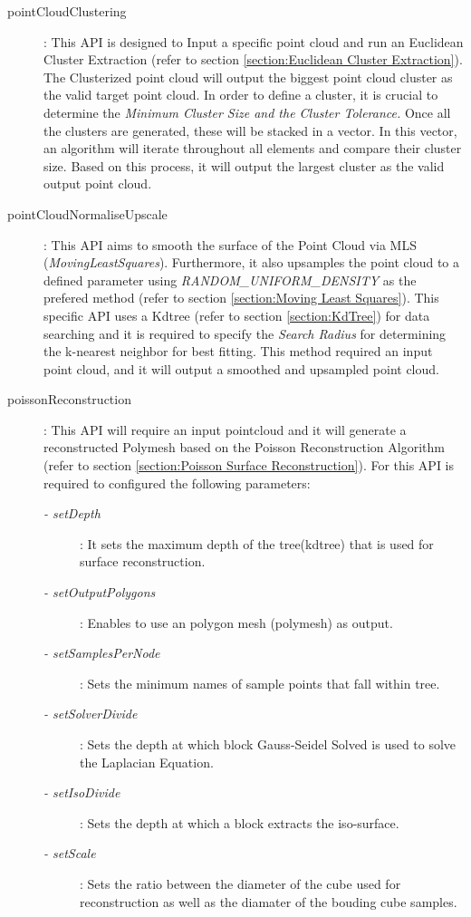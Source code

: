\documentclass[12pt]{report}
\begin{document}
\begin{description}
  \item[pointCloudClustering]: This API is designed to Input a specific point cloud and run an Euclidean Cluster Extraction (refer to section \ref{section:Euclidean Cluster Extraction}). The Clusterized point cloud will output the biggest point cloud cluster as the valid target point cloud.
   In order to define a cluster, it is crucial to determine the \textit{Minimum Cluster Size and the Cluster Tolerance.} Once all the clusters are generated, these will be stacked in a vector. 
   In this vector, an algorithm will iterate throughout all elements and compare their cluster size. Based on this process, it will output the largest cluster as the valid output point cloud.
   \item[pointCloudNormaliseUpscale]: This API aims to smooth the surface of the Point Cloud via MLS (\textit{MovingLeastSquares}). 
   Furthermore, it also upsamples the point cloud to a defined parameter using \textit{RANDOM\_UNIFORM\_DENSITY} as the prefered method (refer to section \ref{section:Moving Least Squares}). 
    This specific API uses a Kdtree (refer to section \ref{section:KdTree}) for data searching and it is required to specify the \textit{Search Radius} for determining the k-nearest neighbor for best fitting. 
   This method required an input point cloud, and it will output a smoothed and upsampled point cloud.
   \item[poissonReconstruction]: This API will require an input pointcloud and it will generate a reconstructed Polymesh based on the Poisson Reconstruction Algorithm (refer to section \ref{section:Poisson Surface Reconstruction}).
   For this API is required to configured the following parameters:
   \begin{description}
     \item[\textit{- setDepth}]: It sets the maximum depth of the tree(kdtree) that is used for surface reconstruction. 
     \item[\textit{- setOutputPolygons}] : Enables to use an polygon mesh (polymesh) as output.
     \item[\textit{- setSamplesPerNode}] : Sets the minimum names of sample points that fall within tree.
     \item[\textit{- setSolverDivide}] : Sets the depth at which block Gauss-Seidel Solved is used to solve the Laplacian Equation.
     \item[\textit{- setIsoDivide}] : Sets the depth at which a block extracts the iso-surface.
     \item[\textit{- setScale}] : Sets the ratio between the diameter of the cube used for reconstruction as well as the diamater of the bouding cube samples.
   \end{description}


\end{description}
\end{document}
